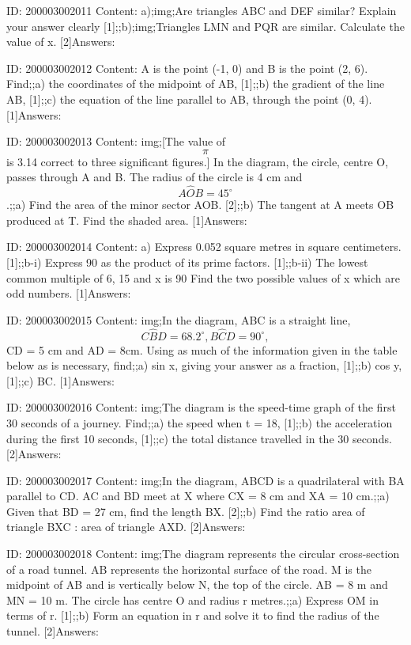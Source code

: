 \documentclass{article}
\begin{document}
ID: 200003002011
Content:
a);img;Are triangles ABC and DEF similar? Explain your answer clearly [1];;b);img;Triangles LMN and PQR are similar. Calculate the value of x. [2]Answers:

ID: 200003002012
Content:
A is the point (-1, 0) and B is the point (2, 6). Find;;a) the coordinates of the midpoint of AB, [1];;b) the gradient of the line AB, [1];;c) the equation of the line parallel to AB, through the point (0, 4). [1]Answers:

ID: 200003002013
Content:
img;[The value of $$\pi$$ is 3.14 correct to three significant figures.] In the diagram, the circle, centre O, passes through A and B. The radius of the circle is 4 cm and $$A \hat OB = 45^{\circ}$$.;;a) Find the area of the minor sector AOB. [2];;b) The tangent at A meets OB produced at T. Find the shaded area. [1]Answers:

ID: 200003002014
Content:
a) Express 0.052 square metres in square centimeters. [1];;b-i) Express 90 as the product of its prime factors. [1];;b-ii) The lowest common multiple of 6, 15 and x is 90 Find the two possible values of x which are odd numbers. [1]Answers:

ID: 200003002015
Content:
img;In the diagram, ABC is a straight line, $$C \hat BD = 68.2^{\circ}, B \hat CD = 90^{\circ},$$ CD = 5 cm and AD = 8cm. Using as much of the information given in the table below as is necessary, find;;a) sin x, giving your answer as a fraction, [1];;b) cos y, [1];;c) BC. [1]Answers:

ID: 200003002016
Content:
img;The diagram is the speed-time graph of the first 30 seconds of a journey. Find;;a) the speed when t = 18, [1];;b) the acceleration during the first 10 seconds, [1];;c) the total distance travelled in the 30 seconds. [2]Answers:

ID: 200003002017
Content:
img;In the diagram, ABCD is a quadrilateral with BA parallel to CD. AC and BD meet at X where CX = 8 cm and XA = 10 cm.;;a) Given that BD = 27 cm, find the length BX. [2];;b) Find the ratio area of triangle BXC : area of triangle AXD. [2]Answers:

ID: 200003002018
Content:
img;The diagram represents the circular cross-section of a road tunnel. AB represents the horizontal surface of the road. M is the midpoint of AB and is vertically below N, the top of the circle. AB = 8 m and MN = 10 m. The circle has centre O and radius r metres.;;a) Express OM in terms of r. [1];;b) Form an equation in r and solve it to find the radius of the tunnel. [2]Answers:
\end{document}
